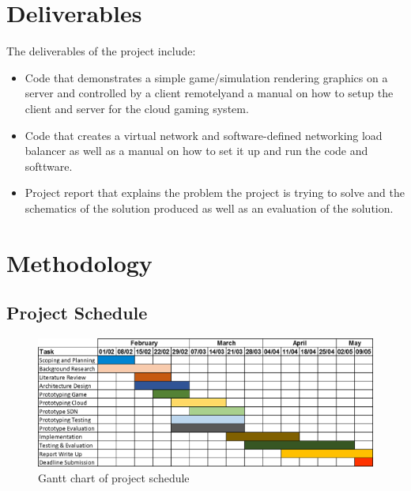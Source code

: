 \section{Deliverables}
The deliverables of the project include:
\begin{itemize}
  \item Code that demonstrates a simple game/simulation rendering graphics on a server and controlled by a client remotelyand a manual on how to setup the client and server for the cloud gaming system.
  \item Code that creates a virtual network and software-defined networking load balancer as well as a manual on how to set it up and run the code and softtware.
  \item Project report that explains the problem the project is trying to solve and the schematics of the solution produced as well as an evaluation of the solution.
\end{itemize}

\section{Methodology}

\subsection{Project Schedule}
\begin{figure}[h]
 \includegraphics[width=\linewidth]{images/gantt.png}
 \caption{Gantt chart of project schedule}
 \label{fig:schedule}
\end{figure}

